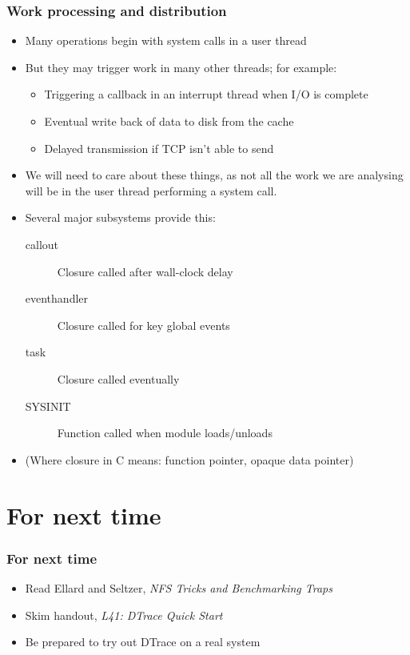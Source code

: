 \begin{frame}
  \frametitle{Work processing and distribution}

  \begin{itemize}
    \item Many operations begin with system calls in a user thread
    \item But they may trigger work in many other threads; for example:
    \begin{itemize}
      \item Triggering a callback in an interrupt thread when I/O is complete
      \item Eventual write back of data to disk from the cache
      \item Delayed transmission if TCP isn't able to send
    \end{itemize}

    \pause
    \medskip

    \item We will need to care about these things, as not all the work we are
      analysing will be in the user thread performing a system call.

    \pause
    \medskip

    \item Several major subsystems provide this:
    \begin{description}
      \item[callout] Closure called after wall-clock delay
      \item[eventhandler] Closure called for key global events
      \item[task] Closure called eventually
      \item[SYSINIT] Function called when module loads/unloads
    \end{description}
    \item (Where closure in C means: function pointer, opaque data pointer)
  \end{itemize}
\end{frame}

\section{For next time}

\begin{frame}
  \frametitle{For next time}

  \begin{itemize}
    \item Read Ellard and Seltzer, \textit{NFS Tricks and Benchmarking Traps}
    \item Skim handout, \textit{L41: DTrace Quick Start}
    \item Be prepared to try out DTrace on a real system
  \end{itemize}
\end{frame}


